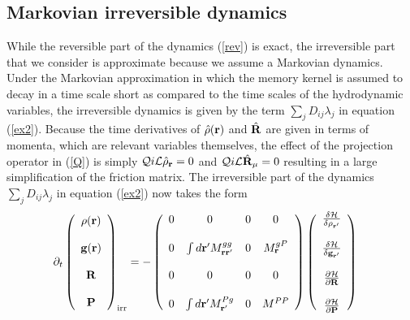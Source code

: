 \documentclass[b5paper,openright,10pt]{book}
\begin{document}
\subsection{Markovian irreversible dynamics}
While the  reversible part of  the dynamics (\ref{rev}) is  exact, the
irreversible  part  that we  consider  is  approximate
because  we assume a  Markovian dynamics.   Under the  Markovian
approximation in which the memory kernel is assumed to decay in a time
scale  short  as compared  to  the  time  scales of  the  hydrodynamic
variables,   the  irreversible   dynamics   is  given   by  the   term
$\sum_jD_{ij}\lambda_j$   in  equation   (\ref{ex2}).   Because   the  time
derivatives of  $\hat{\rho}({\bf r})$ and  $\hat{{\bf R}}$  are given in  terms of
momenta, which  are relevant variables  themselves, the effect  of the
projection operator in (\ref{Q}) is simply ${\cal Q} i{\cal L}\hat{\rho}_{\bf r}=0$
and ${\cal Q}  i{\cal L}\hat{{\bf R}}_{\mu}=0$ resulting in  a large simplification
of  the  friction  matrix.   The irreversible  part  of  the  dynamics
$\sum_jD_{ij}\lambda_j$ in equation (\ref{ex2}) now takes the form
\begin{align}
\partial_t  \left(
    \begin{array}{c}
\rho({\bf r})\\
\\
{\bf g}({\bf r})\\
\\
{\bf R}\\
\\
{\bf P}
    \end{array}
\right)_{\rm irr}
&=
-\left(\begin{array}{cccc}
  0&0 &0&0\\
\\
0 &\int d{\bf r}'M^{gg}_{{\bf r}{\bf r}'}&0&M^{gP}_{\bf r}\\
\\
  0&0 &0&0\\
\\
0&\int d{\bf r}' M^{Pg}_{{\bf r}'}&0&M^{PP}
\end{array}\right)
\left(    \begin{array}{c}
\frac{\delta {\cal H}}{\delta \rho_{{\bf r}'}}\\
\\
\frac{\delta {\cal H}}{\delta {\bf g}_{{\bf r}'}}\\
\\
\frac{\partial {\cal H}}{\partial {\bf R}}\\
\\
\frac{\partial {\cal H}}{\partial {\bf P}}
    \end{array}
\right)
\label{irr1}
\end{align}
\end{document}
